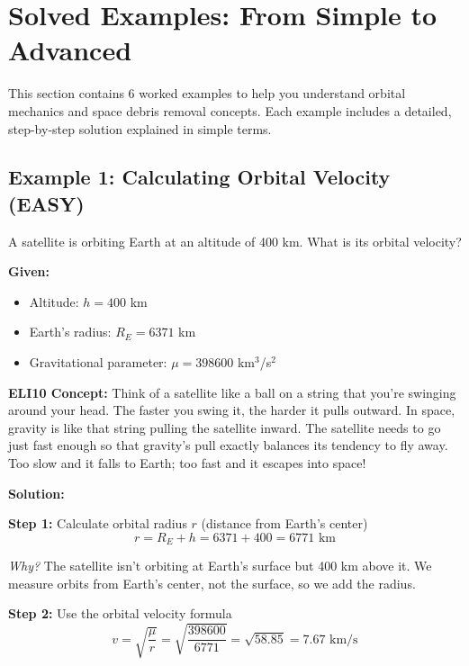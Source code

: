 \documentclass[11pt,a4paper]{article}
\begin{document}
\section{Solved Examples: From Simple to Advanced}

This section contains 6 worked examples to help you understand orbital mechanics and space debris removal concepts. Each example includes a detailed, step-by-step solution explained in simple terms.

\subsection{Example 1: Calculating Orbital Velocity (EASY)}

\begin{tcolorbox}[colback=green!5!white,colframe=green!60!black,title=Problem]
A satellite is orbiting Earth at an altitude of 400 km. What is its orbital velocity?

\textbf{Given:}
\begin{itemize}[nosep]
    \item Altitude: $h = 400$ km
    \item Earth's radius: $R_E = 6371$ km
    \item Gravitational parameter: $\mu = 398600$ km$^3$/s$^2$
\end{itemize}
\end{tcolorbox}

\textbf{ELI10 Concept:} Think of a satellite like a ball on a string that you're swinging around your head. The faster you swing it, the harder it pulls outward. In space, gravity is like that string pulling the satellite inward. The satellite needs to go just fast enough so that gravity's pull exactly balances its tendency to fly away. Too slow and it falls to Earth; too fast and it escapes into space!

\textbf{Solution:}

\textbf{Step 1:} Calculate orbital radius $r$ (distance from Earth's center)
\begin{equation}
r = R_E + h = 6371 + 400 = 6771 \text{ km}
\end{equation}

\textit{Why?} The satellite isn't orbiting at Earth's surface but 400 km above it. We measure orbits from Earth's center, not the surface, so we add the radius.

\textbf{Step 2:} Use the orbital velocity formula
\begin{equation}
v = \sqrt{\frac{\mu}{r}} = \sqrt{\frac{398600}{6771}} = \sqrt{58.85} = 7.67 \text{ km/s}
\end{equation}
\end{document}
